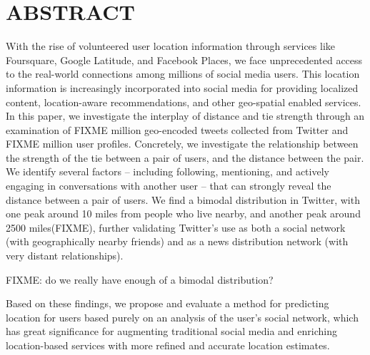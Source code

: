 %
%
%

\chapter*{ABSTRACT}

\pagestyle{plain} %
\setcounter{page}{2}

\indent With the rise of volunteered user location information through services
like Foursquare, Google Latitude, and Facebook Places, we face unprecedented
access to the real-world connections among millions of social media users. This
location information is increasingly incorporated into social media for
providing localized content, location-aware recommendations, and other
geo-spatial enabled services.
In this paper, we investigate the interplay of
distance and tie strength through an examination of FIXME million geo-encoded
tweets collected from Twitter and FIXME million user profiles. Concretely, we
investigate the relationship between the strength of the tie between a pair of
users, and the distance between the pair. We identify several factors --
including following, mentioning, and actively engaging in conversations with
another user -- that can strongly reveal the distance between a pair of users.
We find a bimodal distribution in Twitter, with one peak around 10 miles from
people who live nearby, and another peak around 2500 miles(FIXME), further validating
Twitter's use as both a social network (with geographically nearby friends) and
as a news distribution network (with very distant relationships).

FIXME: do we really have enough of a bimodal distribution?

Based on these findings, we propose and evaluate a method for predicting
location for users based purely on an analysis of the user's social network,
which has great significance for augmenting traditional social media and
enriching location-based services with more refined and accurate location
estimates.


\pagebreak{}
